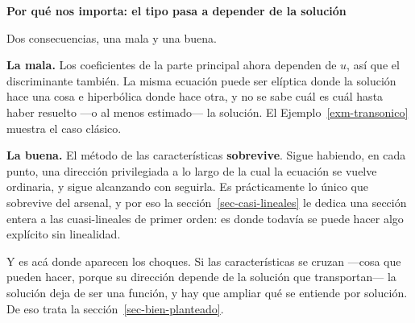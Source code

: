 \documentclass[
  spanish,
  a4paper,
]{scrbook}
\theoremstyle{definition}
\theoremstyle{plain}
\theoremstyle{definition}
\theoremstyle{plain}
\theoremstyle{definition}
\theoremstyle{remark}
\begin{document}
\begin{tcolorbox}[enhanced jigsaw, arc=.35mm, bottomrule=.15mm, breakable, colback=white, colframe=quarto-callout-tip-color-frame, left=2mm, leftrule=.75mm, opacityback=0, rightrule=.15mm, toprule=.15mm]
\begin{minipage}[t]{5.5mm}
\textcolor{quarto-callout-tip-color}{\faLightbulb}
\end{minipage}%
\begin{minipage}[t]{\textwidth - 5.5mm}

\vspace{-3mm}\textbf{Por qué nos importa: el tipo pasa a depender de la solución}\vspace{3mm}

Dos consecuencias, una mala y una buena.

\textbf{La mala.} Los coeficientes de la parte principal ahora dependen
de \(u\), así que el discriminante también. La misma ecuación puede ser
elíptica donde la solución hace una cosa e hiperbólica donde hace otra,
y no se sabe cuál es cuál hasta haber resuelto ---o al menos estimado---
la solución. El Ejemplo~\ref{exm-transonico} muestra el caso clásico.

\textbf{La buena.} El método de las características \textbf{sobrevive}.
Sigue habiendo, en cada punto, una dirección privilegiada a lo largo de
la cual la ecuación se vuelve ordinaria, y sigue alcanzando con
seguirla. Es prácticamente lo único que sobrevive del arsenal, y por eso
la sección~\ref{sec-casi-lineales} le dedica una sección entera a las
cuasi-lineales de primer orden: es donde todavía se puede hacer algo
explícito sin linealidad.

Y es acá donde aparecen los choques. Si las características se cruzan
---cosa que pueden hacer, porque su dirección depende de la solución que
transportan--- la solución deja de ser una función, y hay que ampliar
qué se entiende por solución. De eso trata la
sección~\ref{sec-bien-planteado}.

\end{minipage}%
\end{tcolorbox}
\end{document}
